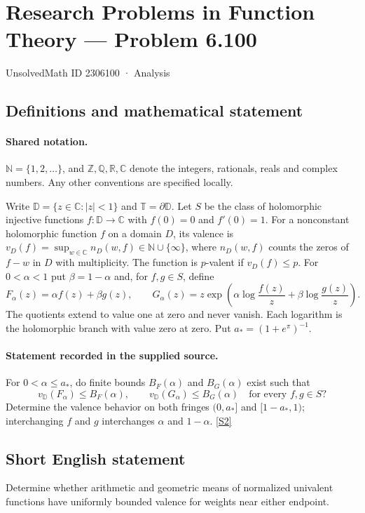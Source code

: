 \documentclass[11pt]{article}
\newcommand{\sref}[2]{\hyperlink{source:#1:#2}{[S#2]}}
\begin{document}
\setcounter{section}{2306099}
\section{Research Problems in Function Theory — Problem 6.100}\label{2306100}
{\small\sffamily UnsolvedMath ID 2306100 · Analysis}
\subsection{Definitions and mathematical statement}

\paragraph{Shared notation.}$\mathbb N=\{1,2,\ldots\}$, and $\mathbb Z,\mathbb Q,\mathbb R,\mathbb C$ denote the integers, rationals, reals and complex numbers. Any other conventions are specified locally.


Write $\mathbb D=\{z\in\mathbb C:|z|<1\}$ and $\mathbb T=\partial\mathbb D$. Let $S$ be the class of holomorphic injective functions $f:\mathbb D\to\mathbb C$ with $f(0)=0$ and $f'(0)=1$. For a nonconstant holomorphic function $f$ on a domain $D$, its valence is $v_D(f)=\sup_{w\in\mathbb C}n_D(w,f)\in\mathbb N\cup\{\infty\}$, where $n_D(w,f)$ counts the zeros of $f-w$ in $D$ with multiplicity. The function is $p$-valent if $v_D(f)\leq p$. For $0<\alpha<1$ put $\beta=1-\alpha$ and, for $f,g\in S$, define
\[F_\alpha(z)=\alpha f(z)+\beta g(z),\qquad
G_\alpha(z)=z\exp\!\left(\alpha\log\frac{f(z)}z+\beta\log\frac{g(z)}z\right).\]
The quotients extend to value one at zero and never vanish. Each logarithm is the holomorphic branch with value zero at zero. Put $a_*=(1+e^{\pi})^{-1}$.
\paragraph{Statement recorded in the supplied source.}
For $0<\alpha\leq a_*$, do finite bounds $B_F(\alpha)$ and $B_G(\alpha)$ exist such that
\[v_{\mathbb D}(F_\alpha)\leq B_F(\alpha),\qquad v_{\mathbb D}(G_\alpha)\leq B_G(\alpha)
\quad\text{for every } f,g\in S?\]
Determine the valence behavior on both fringes $(0,a_*]$ and $[1-a_*,1)$; interchanging $f$ and $g$ interchanges $\alpha$ and $1-\alpha$. \sref{2306100}{2}
\subsection{Short English statement}
Determine whether arithmetic and geometric means of normalized univalent functions have uniformly bounded valence for weights near either endpoint.
\end{document}
